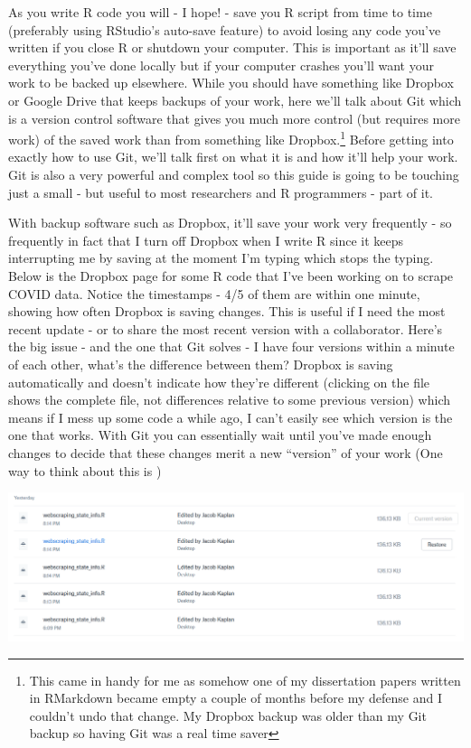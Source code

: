 \documentclass[
  12pt,
]{book}
\begin{document}
As you write R code you will - I hope! - save you R script from time to time (preferably using RStudio's auto-save feature) to avoid losing any code you've written if you close R or shutdown your computer. This is important as it'll save everything you've done locally but if your computer crashes you'll want your work to be backed up elsewhere. While you should have something like Dropbox or Google Drive that keeps backups of your work, here we'll talk about Git which is a version control software that gives you much more control (but requires more work) of the saved work than from something like Dropbox.\footnote{This came in handy for me as somehow one of my dissertation papers written in RMarkdown became empty a couple of months before my defense and I couldn't undo that change. My Dropbox backup was older than my Git backup so having Git was a real time saver} Before getting into exactly how to use Git, we'll talk first on what it is and how it'll help your work. Git is also a very powerful and complex tool so this guide is going to be touching just a small - but useful to most researchers and R programmers - part of it.

With backup software such as Dropbox, it'll save your work very frequently - so frequently in fact that I turn off Dropbox when I write R since it keeps interrupting me by saving at the moment I'm typing which stops the typing. Below is the Dropbox page for some R code that I've been working on to scrape COVID data. Notice the timestamps - 4/5 of them are within one minute, showing how often Dropbox is saving changes. This is useful if I need the most recent update - or to share the most recent version with a collaborator. Here's the big issue - and the one that Git solves - I have four versions within a minute of each other, what's the difference between them? Dropbox is saving automatically and doesn't indicate how they're different (clicking on the file shows the complete file, not differences relative to some previous version) which means if I mess up some code a while ago, I can't easily see which version is the one that works. With Git you can essentially wait until you've made enough changes to decide that these changes merit a new ``version'' of your work (One way to think about this is )

\includegraphics{images/dropbox.png}
\end{document}
